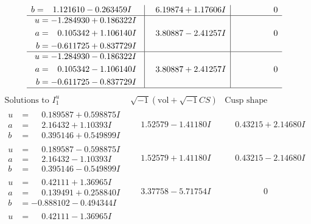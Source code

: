 \documentclass[1p]{elsarticle_modified}
\theoremstyle{definition}
\newcommand{\I}{\sqrt{-1}}
\begin{document}
$$\begin{array}{c|c|c}
\begin{aligned}
b &= \phantom{-}1.121610 - 0.263459 I\end{aligned}
 & \phantom{-}6.19874 + 1.17606 I & \phantom{-0.000000 } 0 \\ \hline\begin{aligned}
u &= -1.284930 + 0.186322 I \\
a &= \phantom{-}0.105342 + 1.106140 I \\
b &= -0.611725 + 0.837729 I\end{aligned}
 & \phantom{-}3.80887 - 2.41257 I & \phantom{-0.000000 } 0 \\ \hline\begin{aligned}
u &= -1.284930 - 0.186322 I \\
a &= \phantom{-}0.105342 - 1.106140 I \\
b &= -0.611725 - 0.837729 I\end{aligned}
 & \phantom{-}3.80887 + 2.41257 I & \phantom{-0.000000 } 0\\
 \hline 
 \end{array}$$\newpage$$\begin{array}{c|c|c}  
\text{Solutions to }I^u_{1}& \I (\text{vol} + \sqrt{-1}CS) & \text{Cusp shape}\\
 \hline 
\begin{aligned}
u &= \phantom{-}0.189587 + 0.598875 I \\
a &= \phantom{-}2.16432 + 1.10393 I \\
b &= \phantom{-}0.395146 + 0.549899 I\end{aligned}
 & \phantom{-}1.52579 - 1.41180 I & \phantom{-}0.43215 + 2.14680 I \\ \hline\begin{aligned}
u &= \phantom{-}0.189587 - 0.598875 I \\
a &= \phantom{-}2.16432 - 1.10393 I \\
b &= \phantom{-}0.395146 - 0.549899 I\end{aligned}
 & \phantom{-}1.52579 + 1.41180 I & \phantom{-}0.43215 - 2.14680 I \\ \hline\begin{aligned}
u &= \phantom{-}0.42111 + 1.36965 I \\
a &= \phantom{-}0.139491 + 0.258840 I \\
b &= -0.888102 - 0.494344 I\end{aligned}
 & \phantom{-}3.37758 - 5.71754 I & \phantom{-0.000000 } 0 \\ \hline\begin{aligned}
u &= \phantom{-}0.42111 - 1.36965 I \\

\end{aligned}
\end{array}$$
\end{document}
